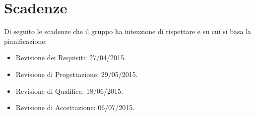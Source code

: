 \section{Scadenze}{
\label{sec:scadenze}
Di seguito le scadenze che il gruppo \gruppo ha intenzione di rispettare e su cui si basa la pianificazione:
\begin{itemize}
	\item Revisione dei Requisiti: 27/04/2015.
	\item Revisione di Progettazione: 29/05/2015.
	\item Revisione di Qualifica: 18/06/2015.
	\item Revisione di Accettazione: 06/07/2015.
\end{itemize}
}